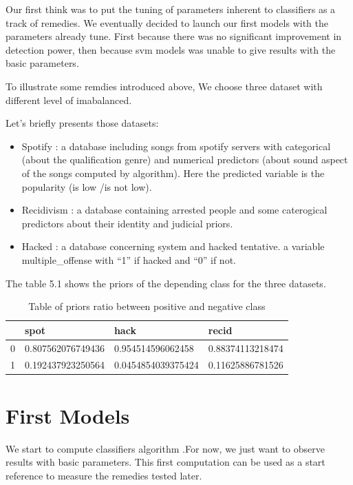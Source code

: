\documentclass[
]{report}
\providecommand{\tightlist}{%
  \setlength{\itemsep}{0pt}\setlength{\parskip}{0pt}}
\begin{document}
Our first think was to put the tuning of parameters inherent to classifiers as a track of remedies. We eventually decided to launch our first models with the parameters already tune. First because there was no significant improvement in detection power, then because svm models was unable to give results with the basic parameters.

To illustrate some remdies introduced above, We choose three dataset with different level of imabalanced.

Let's briefly presents those datasets:

\begin{itemize}
\tightlist
\item
  Spotify : a database including songs from spotify servers with categorical (about the qualification genre) and numerical predictors (about sound aspect of the songs computed by algorithm). Here the predicted variable is the popularity (is low /is not low).
\item
  Recidivism : a database containing arrested people and some caterogical predictors about their identity and judicial priors.
\item
  Hacked : a database concerning system and hacked tentative. a variable multiple\_offense with ``1'' if hacked and ``0'' if not.
\end{itemize}

The table 5.1 shows the priors of the depending class for the three datasets.

\begin{table}

\caption{\label{tab:unnamed-chunk-9}Table of priors ratio between positive and negative class}
\centering
\begin{tabular}[t]{l|l|l|l}
\hline
 & spot & hack & recid\\
\hline
0 & 0.807562076749436 & 0.954514596062458 & 0.88374113218474\\
\hline
1 & 0.192437923250564 & 0.0454854039375424 & 0.11625886781526\\
\hline
\end{tabular}
\end{table}

\hypertarget{first-models}{%
\section{First Models}\label{first-models}}

We start to compute classifiers algorithm .For now, we just want to observe results with basic parameters. This first computation can be used as a start reference to measure the remedies tested later.
\end{document}
